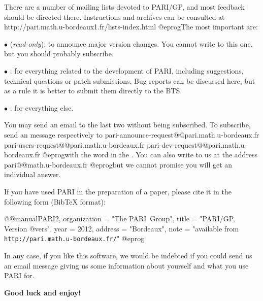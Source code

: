 There are a number of mailing lists devoted to PARI/GP, and most feedback
should be directed there. Instructions and archives can be consulted at
\bprog
  http://pari.math.u-bordeaux1.fr/lists-index.html
@eprog\noindent The most important are:

$\bullet$  (\emph{read-only}): to announce major version
changes. You cannot write to this one, but you should probably subscribe.

$\bullet$ : for everything related to the development of PARI,
including suggestions, technical questions or patch submissions. Bug reports
can be discussed here, but as a rule it is better to submit them directly
to the BTS.

 $\bullet$ : for everything else.

\noindent You may send an email to the last two without being subscribed.
To subscribe, send an message respectively to
\def\@{@}
\bprog
  pari-announce-request@@pari.math.u-bordeaux.fr
     pari-users-request@@pari.math.u-bordeaux.fr
       pari-dev-request@@pari.math.u-bordeaux.fr
@eprog\noindent with the word  in the .
You can also write to us at the address
\bprog
  pari@@math.u-bordeaux.fr
@eprog\noindent but we cannot promise you will get an individual answer.
\smallskip

If you have used PARI in the preparation of a paper, please cite it in the
following form (BibTeX format):

\bprog
@@manual{PARI2,
    organization = "{The PARI~Group}",
    title        = "{PARI/GP, Version @vers}",
    year         = 2012,
    address      = "Bordeaux",
    note         = "available from {\tt http://pari.math.u-bordeaux.fr/}"
}
@eprog
\smallskip

\noindent In any case, if you like this software, we would be indebted if you
could send us an email message giving us some information about yourself and
what you use PARI for.

\medskip
{\bf Good luck and enjoy!}
\vfill\eject
